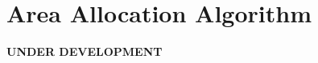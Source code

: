 \documentclass[../main.tex]{subfiles}
\begin{document}

%		








\section{Area Allocation Algorithm}
\label{section:multi_algorithm}
\textbf{UNDER DEVELOPMENT}
\end{document}
